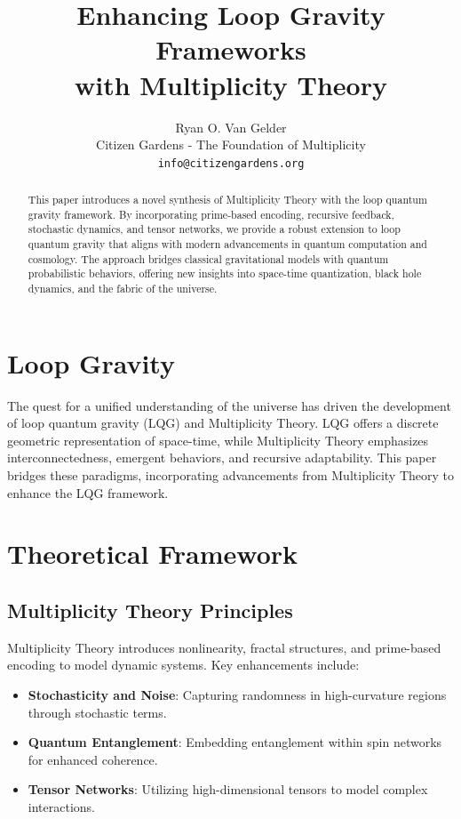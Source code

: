 \documentclass{article}
\title{Enhancing Loop Gravity Frameworks \\ with Multiplicity Theory}
\author{Ryan O. Van Gelder \\
Citizen Gardens - The Foundation of Multiplicity \\
\texttt{info@citizengardens.org}}
\theoremstyle{plain}
\begin{document}
\maketitle

\begin{abstract}
This paper introduces a novel synthesis of Multiplicity Theory with the loop quantum gravity framework. By incorporating prime-based encoding, recursive feedback, stochastic dynamics, and tensor networks, we provide a robust extension to loop quantum gravity that aligns with modern advancements in quantum computation and cosmology. The approach bridges classical gravitational models with quantum probabilistic behaviors, offering new insights into space-time quantization, black hole dynamics, and the fabric of the universe.
\end{abstract}

\section{Loop Gravity}
The quest for a unified understanding of the universe has driven the development of loop quantum gravity (LQG) and Multiplicity Theory. LQG offers a discrete geometric representation of space-time, while Multiplicity Theory emphasizes interconnectedness, emergent behaviors, and recursive adaptability. This paper bridges these paradigms, incorporating advancements from Multiplicity Theory to enhance the LQG framework.

\section{Theoretical Framework}
\subsection{Multiplicity Theory Principles}
Multiplicity Theory introduces nonlinearity, fractal structures, and prime-based encoding to model dynamic systems. Key enhancements include:
\begin{itemize}
    \item \textbf{Stochasticity and Noise}: Capturing randomness in high-curvature regions through stochastic terms\cite{Galioto2024}.
    \item \textbf{Quantum Entanglement}: Embedding entanglement within spin networks for enhanced coherence\cite{VanGelder2024}.
    \item \textbf{Tensor Networks}: Utilizing high-dimensional tensors to model complex interactions\cite{UnifiedMultiplicity2024}.
\end{itemize}
\end{document}
